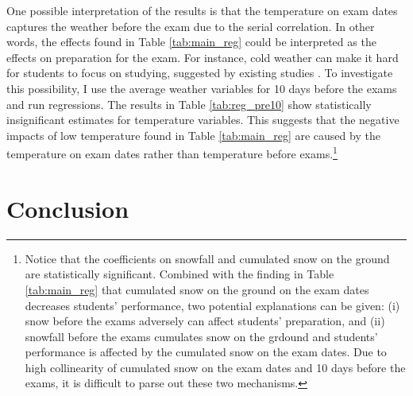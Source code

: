 \documentclass[12pt,letterpaper]{article}
\begin{document}
One possible interpretation of the results is that the temperature on exam dates captures the weather before the exam due to the serial correlation.
In other words, the effects found in Table \ref{tab:main_reg} could be interpreted as the effects on preparation for the exam. 
For instance, cold weather can make it hard for students to focus on studying, suggested by existing studies \citep{Taylor2016}.
To investigate this possibility, I use the average weather variables for 10 days before the exams and run regressions.
The results in Table \ref{tab:reg_pre10} show statistically insignificant estimates for temperature variables.
This suggests that the negative impacts of low temperature found in Table \ref{tab:main_reg} are caused by the temperature on exam dates rather than temperature before exams.\footnote{
  Notice that the coefficients on snowfall and cumulated snow on the ground are statistically significant.
  Combined with the finding in Table \ref{tab:main_reg} that cumulated snow on the ground on the exam dates decreases students' performance, two potential explanations can be given:
  (i) snow before the exams adversely can affect students' preparation, and
  (ii) snowfall before the exams cumulates snow on the grdound and students' performance is affected by the cumulated snow on the exam dates.
  Due to high collinearity of cumulated snow on the exam dates and 10 days before the exams, it is difficult to parse out these two mechanisms.
}

%  

\section{Conclusion}\label{sec:conclusion}
\end{document}
